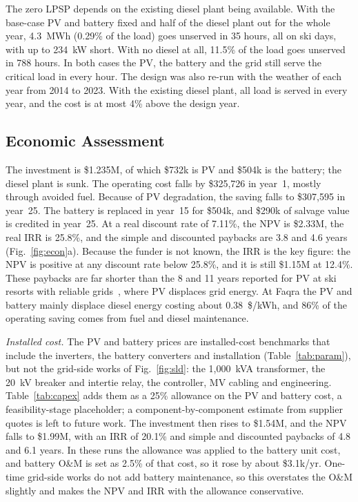 The zero LPSP depends on the existing diesel plant being available. With the base-case PV and battery
fixed and half of the diesel plant out for the whole year, 4.3~MWh (0.29\% of the load) goes unserved
in 35 hours, all on ski days, with up to 234~kW short. With no diesel at all, 11.5\% of the load goes
unserved in 788 hours. In both cases the PV, the battery and the grid still serve the critical load in
every hour. The design was also re-run with the weather of each year from 2014 to 2023. With the
existing diesel plant, all load is served in every year, and the cost is at most 4\% above the design
year.

\subsection{Economic Assessment}
The investment is \$1.235M, of which \$732k is PV and \$504k is the battery; the diesel plant is
sunk. The operating cost falls by \$325,726 in year~1, mostly through avoided fuel. Because of PV
degradation, the saving falls to \$307,595 in year~25. The battery is replaced in year~15 for \$504k,
and \$290k of salvage value is credited in year~25. At a real discount rate of 7.11\%, the NPV is
\$2.33M, the real IRR is 25.8\%, and the simple and discounted paybacks are 3.8 and 4.6 years
(Fig.~\ref{fig:econ}a). Because the funder is not known, the IRR is the key figure: the NPV is
positive at any discount rate below 25.8\%, and it is still \$1.15M at 12.4\%. These paybacks are far
shorter than the 8 and 11 years reported for PV at ski resorts with reliable
grids~\cite{scuderi2025,lewicki2024}, where PV displaces grid energy. At Faqra the PV and battery
mainly displace diesel energy costing about 0.38~\$/kWh, and 86\% of the operating saving comes from
fuel and diesel maintenance.

\emph{Installed cost.} The PV and battery prices are installed-cost benchmarks that include the
inverters, the battery converters and installation (Table~\ref{tab:param}), but not the grid-side works
of Fig.~\ref{fig:sld}: the 1,000~kVA transformer, the 20~kV breaker and intertie relay, the controller,
MV cabling and engineering. Table~\ref{tab:capex} adds them as a 25\% allowance on the PV and battery
cost, a feasibility-stage placeholder; a component-by-component estimate from supplier quotes is
left to future work. The investment then rises to \$1.54M, and the NPV falls to \$1.99M, with an IRR
of 20.1\% and simple and discounted paybacks of 4.8 and 6.1 years. In these runs the allowance was
applied to the battery unit cost, and battery O\&M is set as 2.5\% of that cost, so it rose by about
\$3.1k/yr. One-time grid-side works do not add battery maintenance, so this overstates the O\&M
slightly and makes the NPV and IRR with the allowance conservative.

